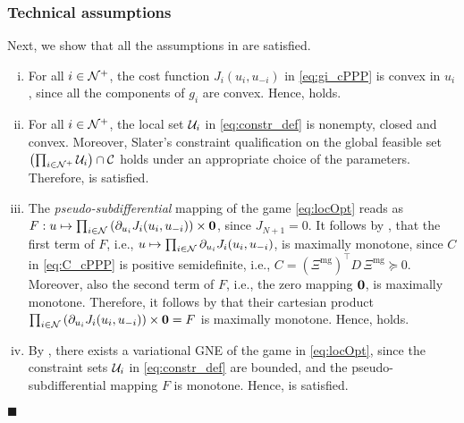 \subsubsection*{Technical assumptions} Next, we show that all the assumptions in \cite[Theorem~2]{belgioioso2020semi} are satisfied.
\begin{enumerate}[(i)]
	\item For all $i \in \mathcal N^+$, the cost function $J_i(u_i, u_{-i})$ in \eqref{eq:gi_cPPP} is convex in $u_i$, since all the components of $g_i$ are convex. Hence, \cite[Assumption~1]{belgioioso2020semi} holds.
	\item For all $i \in \mathcal N^+$, the local set $\mathcal U_i$ in \eqref{eq:constr_def} is nonempty, closed and convex. Moreover, Slater's constraint qualification on the global feasible set $\left( \prod_{i \in \mathcal N^+} \mathcal U_i \right) \cap \mathcal C$ holds under an appropriate choice of the parameters. Therefore, \cite[Assumption~2]{belgioioso2020semi} is satisfied.
	\item The \textit{pseudo-subdifferential} mapping of the game \eqref{eq:locOpt} reads as $F: u \mapsto \prod_{i \in \mathcal N}\left(\partial_{u_i} J_i(u_i, u_{-i})\right)\times \mathbf{0}$, since $J_{N+1}=0$. It follows by \cite[Corollary~1]{belgioioso2017convexity}, that the first term of $F$, i.e., $u \mapsto \prod_{i \in \mathcal N}\partial_{u_i} J_i(u_i, u_{-i})$, is maximally monotone, since  $C$ in \eqref{eq:C_cPPP} is positive semidefinite, i.e., $C=(\Xi^{\text{mg}})^\top D \, \Xi^{\text{mg}} \succeq 0$. Moreover, also the second term of $F$, i.e., the zero mapping $\mathbf{0}$, is maximally monotone. Therefore, it follows by \cite[Proposition~20.23]{bauschke2011convex} that their cartesian product $\prod_{i \in \mathcal N}\left(\partial_{u_i} J_i(u_i, u_{-i})\right)\times \mathbf{0} = F$ is maximally monotone. Hence, \cite[Assumption~6]{belgioioso2020semi} holds.
	\item By \cite[Lemma~1~(i)]{belgioioso2020semi}, there exists a variational GNE of the game in \eqref{eq:locOpt}, since the constraint sets $\mathcal U_i$ in \eqref{eq:constr_def} are bounded, and the pseudo-subdifferential mapping $F$ is monotone. Hence, \cite[Assumption~4]{belgioioso2020semi} is satisfied.
\end{enumerate} 
{\hfill $\blacksquare$}


